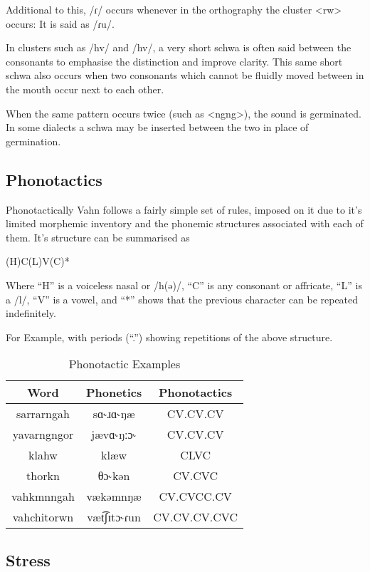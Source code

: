 \documentclass{article}
\begin{document}
Additional to this, /ɾ/ occurs whenever in the orthography the cluster <rw> occurs: It is said as /ɾu/.

In clusters such as /hv/ and /hv/, a very short schwa is often said between the consonants to emphasise the distinction and improve clarity. This same short schwa also occurs when two consonants which cannot be fluidly moved between in the mouth occur next to each other.

When the same pattern occurs twice (such as <ngng>), the sound is germinated. In some dialects a schwa may be inserted between the two in place of germination.

\subsection{Phonotactics}

Phonotactically Vahn follows a fairly simple set of rules, imposed on it due to it's limited morphemic inventory and the phonemic structures associated with each of them. It's structure can be summarised as

\begin{center}
(H)C(L)V(C)*
\end{center}

Where ``H'' is a voiceless nasal or /h(ə)/, ``C'' is any consonant or affricate, ``L'' is a /l/, ``V'' is a vowel, and ``*'' shows that the previous character can be repeated indefinitely.

For Example, with periods (``.'') showing repetitions of the above structure.

\begin{table}[H]
\centering
\begin{tabular}{c|c|c}
 Word & Phonetics & Phonotactics  \\
 \hline
 sarrarngah & sɑ˞ɹɑ˞ŋæ & CV.CV.CV \\
 yavarngngor & jævɑ˞ŋːɔ˞ & CV.CV.CV \\
 klahw & klæw & CLVC \\
 thorkn & θɔ˞kən & CV.CVC \\
 vahkmnngah & vækəmnŋæ & CV.CVCC.CV \\
 vahchitorwn & væt͡ʃɪtɔ˞ɾun & CV.CV.CV.CVC 
\end{tabular}
\caption{Phonotactic Examples}
\label{Phonotactic Examples}
\end{table}

\subsection{Stress}
\end{document}
